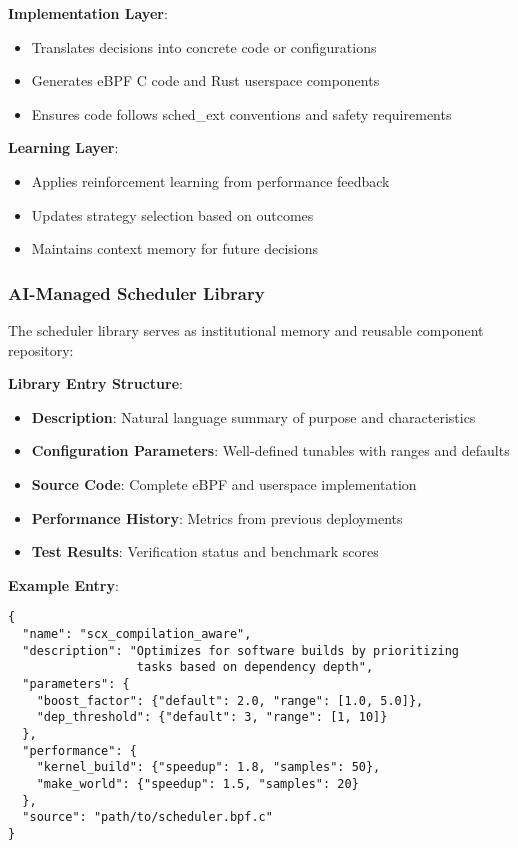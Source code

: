 \textbf{Implementation Layer}:
\begin{itemize}
\item Translates decisions into concrete code or configurations
\item Generates eBPF C code and Rust userspace components
\item Ensures code follows sched\_ext conventions and safety requirements
\end{itemize}

\textbf{Learning Layer}:
\begin{itemize}
\item Applies reinforcement learning from performance feedback
\item Updates strategy selection based on outcomes
\item Maintains context memory for future decisions
\end{itemize}

\subsubsection{AI-Managed Scheduler Library}
The scheduler library serves as institutional memory and reusable component repository:

\textbf{Library Entry Structure}:
\begin{itemize}
\item \textbf{Description}: Natural language summary of purpose and characteristics
\item \textbf{Configuration Parameters}: Well-defined tunables with ranges and defaults
\item \textbf{Source Code}: Complete eBPF and userspace implementation
\item \textbf{Performance History}: Metrics from previous deployments
\item \textbf{Test Results}: Verification status and benchmark scores
\end{itemize}

\textbf{Example Entry}:
\begin{verbatim}
{
  "name": "scx_compilation_aware",
  "description": "Optimizes for software builds by prioritizing 
                  tasks based on dependency depth",
  "parameters": {
    "boost_factor": {"default": 2.0, "range": [1.0, 5.0]},
    "dep_threshold": {"default": 3, "range": [1, 10]}
  },
  "performance": {
    "kernel_build": {"speedup": 1.8, "samples": 50},
    "make_world": {"speedup": 1.5, "samples": 20}
  },
  "source": "path/to/scheduler.bpf.c"
}
\end{verbatim}

